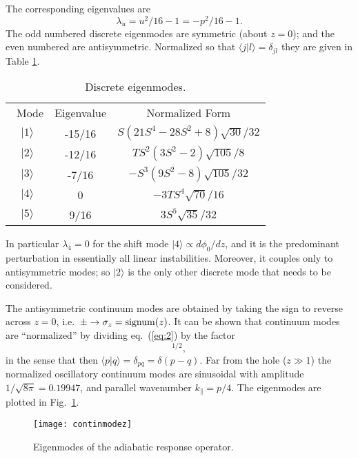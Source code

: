 \documentclass[12pt]{article}
\def\ket#1{|#1\rangle}
\def\bra#1{\langle#1}
\begin{document}
The corresponding eigenvalues are
\begin{equation}
  \label{eq:3}
  \lambda_u= u^2/16-1=-p^2/16-1.
\end{equation}
The odd numbered discrete eigenmodes are symmetric (about $z=0$); and
the even numbered are antisymmetric. Normalized so that
$\bra{j}\ket{l}=\delta_{jl}$ they are given in Table \ref{discrete}. 
\begin{table}[ht]
  \center
\begin{tabular}{ccc}\
  Mode & Eigenvalue & Normalized Form\\
  $\ket{1}$& -15/16&$S(21S^4 - 28S^2 + 8)\sqrt{30}/32$\\
  $\ket{2}$& -12/16&$TS^2(3S^2 - 2)\sqrt{105}/8$\\
  $\ket{3}$& -7/16 &$-S^3(9S^2 - 8)\sqrt{105}/32 $\\
  $\ket{4}$&  0 &$-3TS^4\sqrt{70}/16 $\\
  $\ket{5}$&  9/16 &$3S^5\sqrt{35}/32 $\\
\end{tabular}
\caption{Discrete eigenmodes.\label{discrete}}
\end{table}
\noindent
In particular $\lambda_4=0$ for the shift mode
$\ket{4}\propto d\phi_0/dz$, and it is the predominant
perturbation in essentially all linear instabilities. Moreover, it
couples only to antisymmetric modes; so $\ket{2}$ is the only other
discrete mode that needs to be considered.

The antisymmetric continuum modes are obtained by taking the sign to
reverse across $z=0$, i.e.\ $\pm\to \sigma_z={\rm signum}(z)$.  It can
be shown that continuum modes are ``normalized'' by dividing eq.\
(\ref{eq:2}) by the factor
\begin{equation}
  [8\pi(p^2+1^2)(p^2+2^2)(p^2+3^2)(p^2+4^2)(p^2+5^2)]^{1/2}, 
  \label{eq:4}
\end{equation}
in the sense that then $\bra{p}\ket{q}=\delta_{pq}=\delta(p-q)$. Far
from the hole ($z\gg1$) the normalized oscillatory continuum modes are
sinusoidal with amplitude $1/\sqrt{8\pi}=0.19947$, and parallel wavenumber
$k_\parallel=p/4$. The eigenmodes are plotted in Fig.\
\ref{modeplots}.
\begin{figure}\center
  \texttt{[image: continmodez]}
\caption{Eigenmodes of the adiabatic response operator.\label{modeplots}}
\end{figure}
\end{document}
